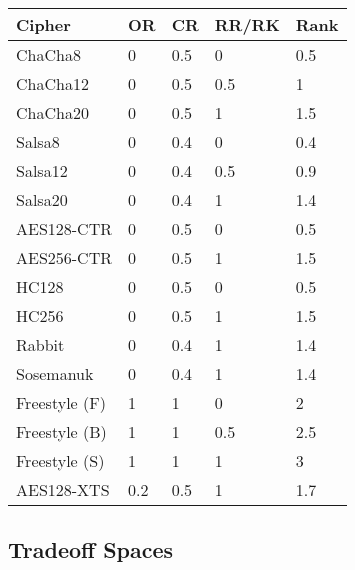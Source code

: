 \begin{table}[]
   \begin{tabular}{@{}lllll@{}}
   \toprule
   \textbf{Cipher} & \textbf{OR} & \textbf{CR} & \textbf{RR/RK} & \textbf{Rank} \\ \midrule
   ChaCha8         & 0           & 0.5         & 0              & 0.5           \\
   ChaCha12        & 0           & 0.5         & 0.5            & 1             \\
   ChaCha20        & 0           & 0.5         & 1              & 1.5           \\
   Salsa8          & 0           & 0.4         & 0              & 0.4           \\
   Salsa12         & 0           & 0.4         & 0.5            & 0.9           \\
   Salsa20         & 0           & 0.4         & 1              & 1.4           \\
   AES128-CTR      & 0           & 0.5         & 0              & 0.5           \\
   AES256-CTR      & 0           & 0.5         & 1              & 1.5           \\
   HC128           & 0           & 0.5         & 0              & 0.5           \\
   HC256           & 0           & 0.5         & 1              & 1.5           \\
   Rabbit          & 0           & 0.4         & 1              & 1.4           \\
   Sosemanuk       & 0           & 0.4         & 1              & 1.4           \\
   Freestyle (F)   & 1           & 1           & 0              & 2             \\
   Freestyle (B)   & 1           & 1           & 0.5            & 2.5           \\
   Freestyle (S)   & 1           & 1           & 1              & 3             \\
   AES128-XTS      & 0.2         & 0.5         & 1              & 1.7
   \end{tabular}
   \caption{}
   \label{tbl:security-quant}
\end{table}

\subsection{Tradeoff Spaces}

